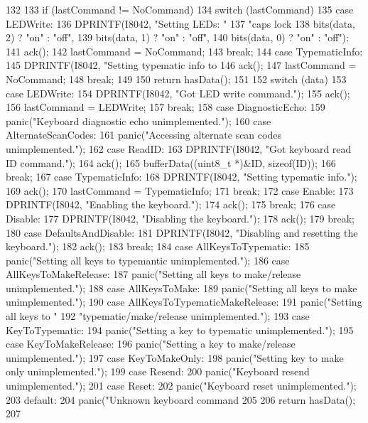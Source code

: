 \begin{DoxyCode}
132 {
133     if (lastCommand != NoCommand) {
134         switch (lastCommand) {
135           case LEDWrite:
136             DPRINTF(I8042, "Setting LEDs: "
137                     "caps lock %
138                     bits(data, 2) ? "on" : "off",
139                     bits(data, 1) ? "on" : "off",
140                     bits(data, 0) ? "on" : "off");
141             ack();
142             lastCommand = NoCommand;
143             break;
144           case TypematicInfo:
145             DPRINTF(I8042, "Setting typematic info to %
146             ack();
147             lastCommand = NoCommand;
148             break;
149         }
150         return hasData();
151     }
152     switch (data) {
153       case LEDWrite:
154         DPRINTF(I8042, "Got LED write command.\n");
155         ack();
156         lastCommand = LEDWrite;
157         break;
158       case DiagnosticEcho:
159         panic("Keyboard diagnostic echo unimplemented.\n");
160       case AlternateScanCodes:
161         panic("Accessing alternate scan codes unimplemented.\n");
162       case ReadID:
163         DPRINTF(I8042, "Got keyboard read ID command.\n");
164         ack();
165         bufferData((uint8_t *)&ID, sizeof(ID));
166         break;
167       case TypematicInfo:
168         DPRINTF(I8042, "Setting typematic info.\n");
169         ack();
170         lastCommand = TypematicInfo;
171         break;
172       case Enable:
173         DPRINTF(I8042, "Enabling the keyboard.\n");
174         ack();
175         break;
176       case Disable:
177         DPRINTF(I8042, "Disabling the keyboard.\n");
178         ack();
179         break;
180       case DefaultsAndDisable:
181         DPRINTF(I8042, "Disabling and resetting the keyboard.\n");
182         ack();
183         break;
184       case AllKeysToTypematic:
185         panic("Setting all keys to typemantic unimplemented.\n");
186       case AllKeysToMakeRelease:
187         panic("Setting all keys to make/release unimplemented.\n");
188       case AllKeysToMake:
189         panic("Setting all keys to make unimplemented.\n");
190       case AllKeysToTypematicMakeRelease:
191         panic("Setting all keys to "
192                 "typematic/make/release unimplemented.\n");
193       case KeyToTypematic:
194         panic("Setting a key to typematic unimplemented.\n");
195       case KeyToMakeRelease:
196         panic("Setting a key to make/release unimplemented.\n");
197       case KeyToMakeOnly:
198         panic("Setting key to make only unimplemented.\n");
199       case Resend:
200         panic("Keyboard resend unimplemented.\n");
201       case Reset:
202         panic("Keyboard reset unimplemented.\n");
203       default:
204         panic("Unknown keyboard command %
205     }
206     return hasData();
207 }
\end{DoxyCode}
